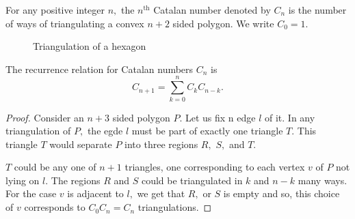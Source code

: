 

\begin{definition}
	For any positive integer $n,$ the $n^\text{th}$ Catalan number
	denoted by $C_n$ is the number of ways of triangulating a convex
	$n+2$ sided polygon. We write $C_0 = 1.$
\end{definition}

\begin{center}
	\begin{figure}[h]
		\centering
		\caption{Triangulation of a hexagon}
		\label{fig:triangulation-hexagon}
	\end{figure}
\end{center}

The recurrence relation for Catalan numbers $C_n$ is 
$$C_{n+1} = \sum_{k=0}^{n} C_k C_{n-k}.$$
\begin{proof}
	Consider an $n+3$ sided polygon $P.$ Let us fix n edge
	$l$ of it. In any triangulation of $P,$ the egde $l$
	must be part of exactly one triangle $T.$
	This triangle $T$ would separate $P$ into three
	regions $R,$ $S,$ and $T.$


	$T$ could be any one of $n+1$ triangles, one corresponding
	to each vertex $v$ of $P$ not lying on $l.$ The
	regions $R$ and $S$ could be triangulated in $k$
	and $n-k$ many ways. For the case $v$ is adjacent to $l,$
	we get that $R,$ or $S$ is empty and so, this choice of $v$
	corresponds to $C_0 C_n= C_n$ triangulations.
\end{proof}

